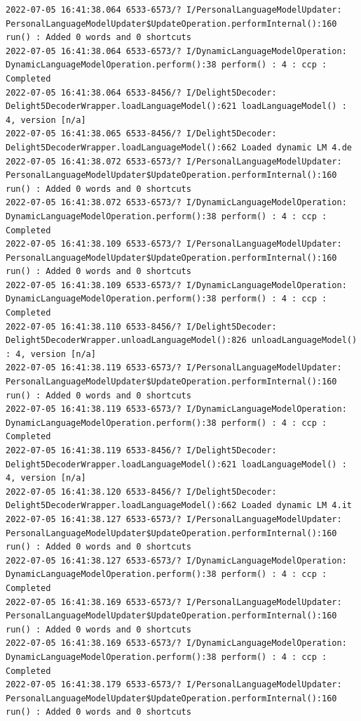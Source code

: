 \documentclass[a4paper,12pt]{book}
\begin{document}
\begin{lstlisting}
2022-07-05 16:41:38.064 6533-6573/? I/PersonalLanguageModelUpdater: PersonalLanguageModelUpdater$UpdateOperation.performInternal():160 run() : Added 0 words and 0 shortcuts
2022-07-05 16:41:38.064 6533-6573/? I/DynamicLanguageModelOperation: DynamicLanguageModelOperation.perform():38 perform() : 4 : ccp : Completed
2022-07-05 16:41:38.064 6533-8456/? I/Delight5Decoder: Delight5DecoderWrapper.loadLanguageModel():621 loadLanguageModel() : 4, version [n/a]
2022-07-05 16:41:38.065 6533-8456/? I/Delight5Decoder: Delight5DecoderWrapper.loadLanguageModel():662 Loaded dynamic LM 4.de
2022-07-05 16:41:38.072 6533-6573/? I/PersonalLanguageModelUpdater: PersonalLanguageModelUpdater$UpdateOperation.performInternal():160 run() : Added 0 words and 0 shortcuts
2022-07-05 16:41:38.072 6533-6573/? I/DynamicLanguageModelOperation: DynamicLanguageModelOperation.perform():38 perform() : 4 : ccp : Completed
2022-07-05 16:41:38.109 6533-6573/? I/PersonalLanguageModelUpdater: PersonalLanguageModelUpdater$UpdateOperation.performInternal():160 run() : Added 0 words and 0 shortcuts
2022-07-05 16:41:38.109 6533-6573/? I/DynamicLanguageModelOperation: DynamicLanguageModelOperation.perform():38 perform() : 4 : ccp : Completed
2022-07-05 16:41:38.110 6533-8456/? I/Delight5Decoder: Delight5DecoderWrapper.unloadLanguageModel():826 unloadLanguageModel() : 4, version [n/a]
2022-07-05 16:41:38.119 6533-6573/? I/PersonalLanguageModelUpdater: PersonalLanguageModelUpdater$UpdateOperation.performInternal():160 run() : Added 0 words and 0 shortcuts
2022-07-05 16:41:38.119 6533-6573/? I/DynamicLanguageModelOperation: DynamicLanguageModelOperation.perform():38 perform() : 4 : ccp : Completed
2022-07-05 16:41:38.119 6533-8456/? I/Delight5Decoder: Delight5DecoderWrapper.loadLanguageModel():621 loadLanguageModel() : 4, version [n/a]
2022-07-05 16:41:38.120 6533-8456/? I/Delight5Decoder: Delight5DecoderWrapper.loadLanguageModel():662 Loaded dynamic LM 4.it
2022-07-05 16:41:38.127 6533-6573/? I/PersonalLanguageModelUpdater: PersonalLanguageModelUpdater$UpdateOperation.performInternal():160 run() : Added 0 words and 0 shortcuts
2022-07-05 16:41:38.127 6533-6573/? I/DynamicLanguageModelOperation: DynamicLanguageModelOperation.perform():38 perform() : 4 : ccp : Completed
2022-07-05 16:41:38.169 6533-6573/? I/PersonalLanguageModelUpdater: PersonalLanguageModelUpdater$UpdateOperation.performInternal():160 run() : Added 0 words and 0 shortcuts
2022-07-05 16:41:38.169 6533-6573/? I/DynamicLanguageModelOperation: DynamicLanguageModelOperation.perform():38 perform() : 4 : ccp : Completed
2022-07-05 16:41:38.179 6533-6573/? I/PersonalLanguageModelUpdater: PersonalLanguageModelUpdater$UpdateOperation.performInternal():160 run() : Added 0 words and 0 shortcuts

\end{lstlisting}
\end{document}
